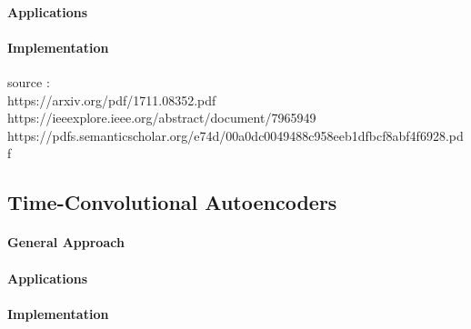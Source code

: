 \documentclass[11pt]{article}
\begin{document}
\paragraph{Applications} 
\paragraph{Implementation} 

source : \\
https://arxiv.org/pdf/1711.08352.pdf \\
https://ieeexplore.ieee.org/abstract/document/7965949 \\
https://pdfs.semanticscholar.org/e74d/00a0dc0049488c958eeb1dfbcf8abf4f6928.pdf \\

\subsection{Time-Convolutional Autoencoders}
\paragraph{General Approach}
\paragraph{Applications}
\paragraph{Implementation}
\end{document}
